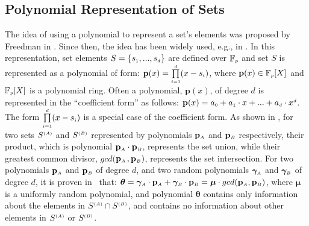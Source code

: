 
\subsection{Polynomial Representation of Sets}\label{sec::poly-rep}


The idea of using a polynomial to represent a set's elements was proposed by Freedman  \et in \cite{DBLP:conf/eurocrypt/FreedmanNP04}. Since then,   the idea has been widely used,  e.g., in \cite{DBLP:conf/fc/AbadiTD16,Feather2020,GhoshS19,DBLP:conf/crypto/KissnerS05}. In this representation, set elements $S=\{s_{\scriptscriptstyle 1},...,s_{\scriptscriptstyle d}\}$ are defined over  $\mathbb{F}_{\scriptscriptstyle p}$ and  set $S$ is represented as a polynomial of   form: $\mathbf{p}(x)=\prod\limits ^{\scriptscriptstyle {d}}_{\scriptscriptstyle i=1}(x-s_{\scriptscriptstyle i})$, where $\mathbf{p}(x) \in \mathbb{F}_{\scriptscriptstyle p}[X]$ and $\mathbb{F}_{\scriptscriptstyle p}[X]$ is a polynomial ring.  Often a   polynomial,  $\mathbf{p}(x)$, of degree $d$ is  represented in the ``coefficient form'' as follows:  $\mathbf{p}(x)=a_{\scriptscriptstyle 0}+a_{\scriptscriptstyle 1}\cdot x+...+ a_{\scriptscriptstyle d}\cdot x^{\scriptscriptstyle d}$. The form $\prod\limits ^{\scriptscriptstyle {d}}_{\scriptscriptstyle i=1}(x-s_{\scriptscriptstyle i})$ is a special case of the coefficient form. As shown in \cite{BonehGHWW13,DBLP:conf/crypto/KissnerS05}, for two sets $S^{\scriptscriptstyle (A)}$ and $S^{\scriptscriptstyle (B)}$ represented by polynomials $\mathbf{p}_{\scriptscriptstyle A}$ and $\mathbf{p}_{\scriptscriptstyle B}$ respectively, their product, which is polynomial $\mathbf{p}_{\scriptscriptstyle A}\cdot \mathbf{p}_{\scriptscriptstyle  B}$,  represents the set union, while their greatest common divisor, $gcd($$\mathbf{p}_{\scriptscriptstyle A}$$,\mathbf{p}_{\scriptscriptstyle B})$, represents the set intersection. For two polynomials $\mathbf{p}_{\scriptscriptstyle A}$ and $\mathbf{p}_{\scriptscriptstyle B}$ of degree $d$, and two random polynomials $\bm\gamma_{\scriptscriptstyle A}$ and  $\bm\gamma_{\scriptscriptstyle B}$ of degree $d$, it is proven in~\cite{BonehGHWW13,DBLP:conf/crypto/KissnerS05} that: $\bm\theta=\bm\gamma_{\scriptscriptstyle A}\cdot \mathbf{p}_{\scriptscriptstyle A}+\bm\gamma_{\scriptscriptstyle B}\cdot\mathbf{p}_{\scriptscriptstyle B}=\bm\mu\cdot gcd(\mathbf{p}_{\scriptscriptstyle A},\mathbf{p}_{\scriptscriptstyle B})$, where $\bm\mu$ is a uniformly random polynomial, and polynomial $\bm\theta$ contains only information about the elements in  $S^{\scriptscriptstyle (A)}\cap S^{\scriptscriptstyle (B)}$, and contains no information about other elements in $S^{\scriptscriptstyle (A)}$ or $S^{\scriptscriptstyle (B)}$.  

